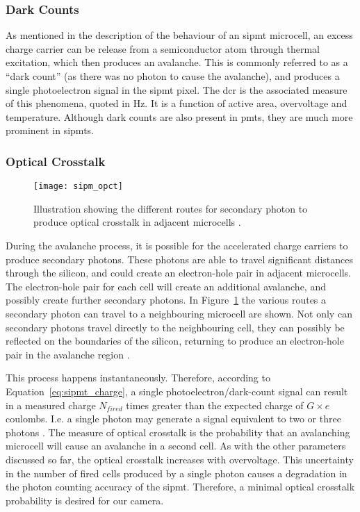 \subsubsection{Dark Counts}

As mentioned in the description of the behaviour of an \gls{sipmt} microcell, an excess charge carrier can be release from a semiconductor atom through thermal excitation, which then produces an avalanche. This is commonly referred to as a ``dark count'' (as there was no photon to cause the avalanche), and produces a single photoelectron signal in the \gls{sipmt} pixel. The \gls{dcr} is the associated measure of this phenomena, quoted in \si{Hz}. It is a function of active area, overvoltage and temperature. Although dark counts are also present in \glspl{pmt}, they are much more prominent in \glspl{sipmt}.

\subsubsection{Optical Crosstalk}

\begin{figure}
	\centering
    \texttt{[image: sipm\_opct]} 
	\caption[Illustration of the possible ways optical crosstalk is produced.]{Illustration showing the different routes for secondary photon to produce optical crosstalk in adjacent microcells \cite{Rech2008}.}
	\label{fig:sipm_opct}
\end{figure}

During the avalanche process, it is possible for the accelerated charge carriers to produce secondary photons. These photons are able to travel significant distances through the silicon, and could create an electron-hole pair in adjacent microcells. The electron-hole pair for each cell will create an additional avalanche, and possibly create further secondary photons. In Figure~\ref{fig:sipm_opct} the various routes a secondary photon can travel to a neighbouring microcell are shown. Not only can secondary photons travel directly to the neighbouring cell, they can possibly be reflected on the boundaries of the silicon, returning to produce an electron-hole pair in the avalanche region \cite{Rech2008}.

This process happens instantaneously. Therefore, according to Equation~\ref{eq:sipmt_charge}, a single photoelectron/dark-count signal can result in a measured charge $N_{fired}$ times greater than the expected charge of $G \times e$ coulombs. I.e. a single photon may generate a signal equivalent to two or three photons \cite{SensL2011}. The measure of optical crosstalk is the probability that an avalanching microcell will cause an avalanche in a second cell. As with the other parameters discussed so far, the optical crosstalk increases with overvoltage. This uncertainty in the number of fired cells produced by a single photon causes a degradation in the photon counting accuracy of the \gls{sipmt}. Therefore, a minimal optical crosstalk probability is desired for our camera.

